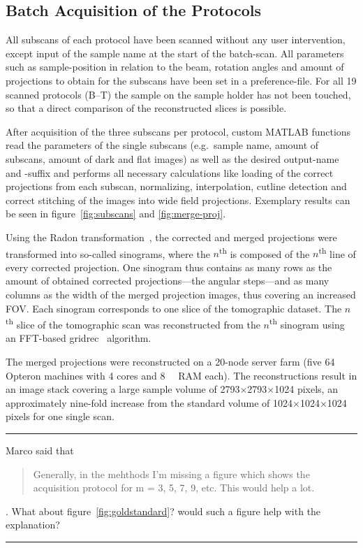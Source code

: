 \cbstart
\subsection{Batch Acquisition of the Protocols}
All subscans of each protocol have been scanned without any user intervention, except input of the sample name at the start of the batch-scan. All parameters such as sample-position in relation to the beam, rotation angles and amount of projections to obtain for the subscans have been set in a preference-file. For all 19 scanned protocols (B--T) the sample on the sample holder has not been touched, so that a direct comparison of the reconstructed slices is possible.

After acquisition of the three subscans per protocol, custom MATLAB functions read the parameters of the single subscans (e.g.\ sample name, amount of subscans, amount of dark and flat images) as well as the desired output-name and -suffix and performs all necessary calculations like loading of the correct projections from each subscan, normalizing, interpolation, cutline detection and correct stitching of the images into wide field projections. Exemplary results can be seen in figure~\ref{fig:subscans} and \ref{fig:merge-proj}.

Using the Radon transformation~\cite{Radon1917}, the corrected and merged projections were transformed into so-called sinograms, where the $n$\textsuperscript{th} is composed of the $n$\textsuperscript{th} line of every corrected projection. One sinogram thus contains as many rows as the amount of obtained corrected projections---the angular steps---and as many columns as the width of the merged projection images, thus covering an increased FOV. Each sinogram corresponds to one slice of the tomographic dataset. The $n$\textsuperscript{th} slice of the tomographic scan was reconstructed from the $n$\textsuperscript{th} sinogram using an FFT-based gridrec~\cite{Dowd1999} algorithm.

The merged projections were reconstructed on a 20-node server farm (five \SI{64}{\bit} Opteron machines with 4 cores and \SI{8}{\giga\byte} RAM each). The reconstructions result in an image stack covering a large sample volume of 2793$\times$2793$\times$1024 pixels, an approximately nine-fold increase from the standard volume of 1024$\times$1024$\times$1024 pixels for one single scan.
\cbend

\hrule
Marco said that \begin{quote}Generally, in the mehthods I'm missing a figure which shows the acquisition protocol for m = 3, 5, 7, 9, etc. This would help a lot.\end{quote}. What about figure~\ref{fig:goldstandard}? would such a figure help with the explanation?

\begin{figure*}[htp]
	\centering%
	\caption{Setup for 3, 5 and 7 SubScans, desired by Marco}%
	\label{fig:goldstandard}%
\end{figure*}

\hrule